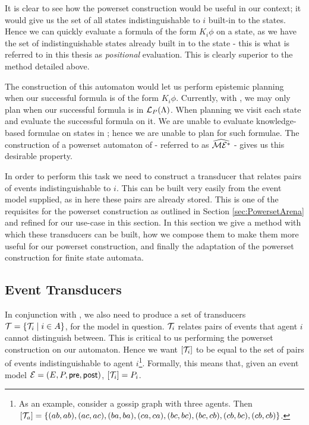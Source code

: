 \documentclass[ %
                    author={Leo Poulson},
                supervisor={Dr. Steven Ramsay},
                    degree={BSc},
                     title={Epistemic Planning for the Dynamic Gossip problem},
                  subtitle={},
                      year={2019} ]{dissertation}
\begin{document}
It is clear to see how the powerset construction would be useful in our context;
it would give us the set of all states indistinguishable to $i$ built-in to the
states. Hence we can quickly evaluate a formula of the form $K_i \phi$ on a
state, as we have the set of indistinguishable states already built in to the
state - this is what is referred to in this thesis as \emph{positional}
evaluation. This is clearly superior to the method detailed above. 

The construction of this automaton would let us perform epistemic planning when
our successful formula is of the form $K_i \phi$. Currently, with \mestar, we
may only plan when our successful formula is in $\mathcal{L}_P(\Lambda)$. When
planning we visit each state and evaluate the successful formula on it. We are
unable to evaluate knowledge-based formulae on states in \mestar; hence we are
unable to plan for such formulae. The construction of a powerset automaton of
\mestar - referred to as $\widehat{\mathcal{ME^\ast}}$ - gives us this desirable property.

In order to perform this task we need to construct a transducer that relates
pairs of events indistinguishable to $i$. This can be built very easily from the
event model supplied, as in here these pairs are already stored. This is one of
the requisites for the powerset construction as outlined in Section
\ref{sec:PowersetArena} and refined for our use-case in this section. In this
section we give a method with which these transducers can be built, how we
compose them to make them more useful for our powerset construction, and finally
the adaptation of the powerset construction for finite state automata.

\subsection{Event Transducers}

In conjunction with \mestar, we also need to produce a set of transducers
$\mathcal{T} = \{\mathcal{T}_i \mid i \in A\}$, for the model in question. $\mathcal{T}_i$
relates pairs of events that agent $i$ cannot distinguish between. This is
critical to us performing the powerset construction on our \mestar automaton.
Hence we want $\left[ \mathcal{T}_i \right]$ to be equal to the set of pairs of events
indistinguishable to agent $i$\footnote{As an example, consider a gossip graph
  with three agents. Then $\left[ \mathcal{T}_a \right] = \left\{ (ab, ab), (ac, ac),
    (ba, ba), (ca, ca), (bc, bc), (bc, cb), (cb, bc), (cb, cb) \right\} $.}.
Formally, this means that, given an event model $\mathcal{E} = (E, P, \textsf{pre}, \textsf{post})$,
$[\mathcal{T}_i] = P_i$. 
\end{document}
